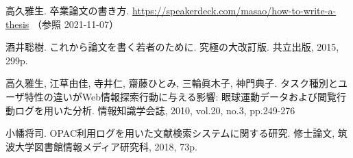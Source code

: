 \begin{thebibliography}{99}
高久雅生. 卒業論文の書き方.
\url{https://speakerdeck.com/masao/how-to-write-a-thesis} （参照 2021-11-07）

酒井聡樹.
これから論文を書く若者のために.
究極の大改訂版.
共立出版, 2015, 299p.

高久雅生, 江草由佳, 寺井仁, 齋藤ひとみ, 三輪眞木子, 神門典子.
タスク種別とユーザ特性の違いがWeb情報探索行動に与える影響: 眼球運動データおよび閲覧行動ログを用いた分析.
情報知識学会誌, 2010, vol.20, no.3, pp.249-276

小幡将司.
OPAC利用ログを用いた文献検索システムに関する研究.
修士論文, 筑波大学図書館情報メディア研究科, 2018, 73p.
\end{thebibliography}